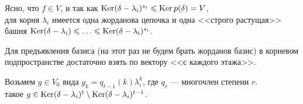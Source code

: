 \otstup

Ясно, что $f\in V$, и так как 
$\mathop{\rm Ker}\nolimits (\delta-\lambda_i)^{s_i} \leqslant  \mathop{\rm Ker}\nolimits p(\delta)=V$, \\
 для корня $\lambda_i$ имеется одна жорданова цепочка
и одна <<строго растущая>> башня $\mathop{\rm Ker}\nolimits (\delta-\lambda_i) \leqslant \ldots \leqslant \mathop{\rm Ker}\nolimits (\delta-\lambda_i)^{s_i}$.\\

\otstup

Для предъявления базиса (на этот раз не будем брать жорданов базис)
в корневом подпространстве достаточно взять по вектору
<<с каждого этажа>>.

\otstup

Возьмем $g\in V_0$ вида  $g_k = q_{t-1}(k)\lambda_i^k$, где $q_r$ --- многочлен степени $r$.\\
такое $g\in \mathop{\rm Ker}\nolimits (\delta-\lambda_i)^{t} \setminus \mathop{\rm Ker}\nolimits (\delta-\lambda_i)^{t-1}$.


 
